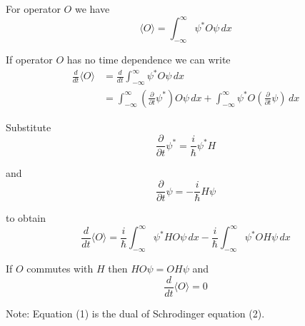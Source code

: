 


\bigskip
For operator $O$ we have
\begin{equation*}
\langle O\rangle=\int_{-\infty}^\infty\psi^*O\psi\,dx
\end{equation*}

If operator $O$ has no time dependence we can write
\begin{align*}
\frac{d}{dt}\langle O\rangle
&=\frac{d}{dt}\int_{-\infty}^\infty\psi^*O\psi\,dx
\\
&=\int_{-\infty}^\infty\left(\frac{\partial}{\partial t}\psi^*\right)O\psi\,dx
+\int_{-\infty}^\infty\psi^*O\left(\frac{\partial}{\partial t}\psi\right)\,dx
\end{align*}

Substitute
\begin{equation*}
\frac{\partial}{\partial t}\psi^*=\frac{i}{\hbar}\psi^*H
\tag{1}
\end{equation*}

and
\begin{equation*}
\frac{\partial}{\partial t}\psi=-\frac{i}{\hbar}H\psi
\tag{2}
\end{equation*}

to obtain
\begin{equation*}
\frac{d}{dt}\langle O\rangle
=\frac{i}{\hbar}\int_{-\infty}^\infty\psi^*HO\psi\,dx
-\frac{i}{\hbar}\int_{-\infty}^\infty\psi^*OH\psi\,dx
\end{equation*}

If $O$ commutes with $H$ then $HO\psi=OH\psi$ and
\begin{equation*}
\frac{d}{dt}\langle O\rangle=0
\end{equation*}

Note: Equation (1) is the dual of Schrodinger equation (2).


